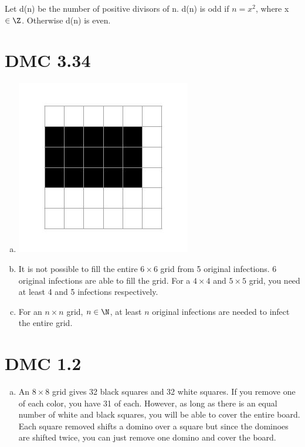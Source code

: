 \documentclass[]{article}
\def\math#1{$#1$}
\begin{document}
Let d(n) be the number of positive divisors of n.
\newline d(n) is odd if \math{n = x^2}, where x \math{\in \Z}.
\newline Otherwise d(n) is even.

\section{DMC 3.34}
\begin{enumerate}[(a)]
\item
\includegraphics[width=\linewidth]{infection}


\item It is not possible to fill the entire \math{6\times 6} grid from 5 original infections.
 6 original infections are able to fill the grid.
\newline For a \math{4\times 4} and \math{5\times 5} grid, you need at least 4 and 5 infections respectively.
\item For an \math{n\times n} grid, \math{n \in \N}, at least \math{n} original infections are needed to infect the entire grid.
\end{enumerate}

\section{DMC 1.2}
\begin{enumerate}[(f)]
\item An \math{8\times 8} grid gives 32 black squares and 32 white squares. If you remove one of each color, you have 31 of each. However, as long as there is an equal number of white and black squares, you will be able to cover the entire board. Each square removed shifts a domino over a square but since the dominoes are shifted twice, you can just remove one domino and cover the board.
\end{enumerate}
\end{document}
